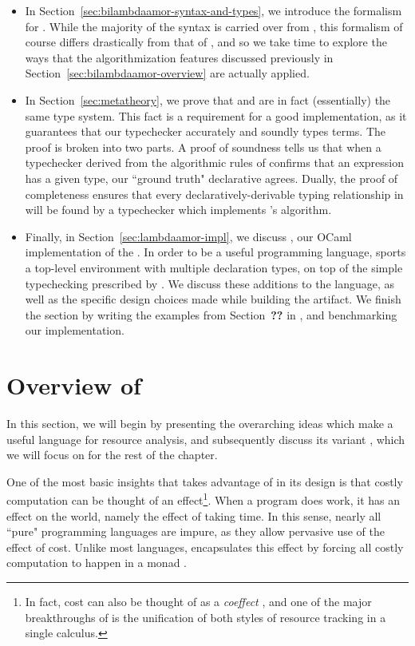 \begin{itemize}
 \item In Section~\ref{sec:bilambdaamor-syntax-and-types}, we introduce the formalism for \bilambdaamor. While the majority of the syntax is carried over from \dlambdaamor, this formalism of course differs drastically from that of \dlambdaamor, and so we take time to explore the ways that the algorithmization features discussed previously in Section~\ref{sec:bilambdaamor-overview} are actually applied.
 
 \item In Section~\ref{sec:metatheory}, we prove that \bilambdaamor and \dlambdaamor are in fact (essentially) the same type system. This fact is a requirement for a good implementation, as it guarantees that our typechecker accurately and soundly types terms. The proof is broken into two parts. A proof of soundness tells us that when a typechecker derived from the algorithmic rules of \bilambdaamor confirms that an expression has a given type, our ``ground truth" declarative \dlambdaamor agrees. Dually, the proof of completeness ensures that every declaratively-derivable typing relationship in \dlambdaamor will be found by a typechecker which implements \bilambdaamor's algorithm.
 
 \item Finally, in Section~\ref{sec:lambdaamor-impl}, we discuss \lambdaamorimpl, our OCaml implementation of the \dlambdaamor. In order to be a useful programming language, \lambdaamorimpl sports a top-level environment with multiple declaration types, on top of the simple typechecking prescribed by \bilambdaamor. We discuss these additions to the language, as well as the specific design choices made while building the artifact. We finish the section by writing the examples from Section~\textbf{??} in \lambdaamorimpl, and benchmarking our implementation.
\end{itemize}


\section{Overview of \dlambdaamor} 
\label{sec:dlambdaamor-overview}
In this section, we will begin by presenting the overarching ideas which make \lambdaamor a useful language for resource analysis, and subsequently discuss its variant \dlambdaamor, which we will focus on for the rest of the chapter.

One of the most basic insights that \lambdaamor takes advantage of in its design is that costly computation can be thought of an effect\footnote{
In fact, cost can also be thought of as a \textit{coeffect} \cite{girard-et-al:tcs92:bll}, and one of the major breakthroughs of \lambdaamor is the unification
of both styles of resource tracking in a single calculus.
}. When a program does work, it has an effect on the world, namely the effect of taking time. In this sense, nearly all ``pure" programming languages are impure, as they allow pervasive use of the effect of cost. Unlike most languages, \lambdaamor encapsulates this effect by forcing all costly computation to happen in a monad \cite{moggi91}.

